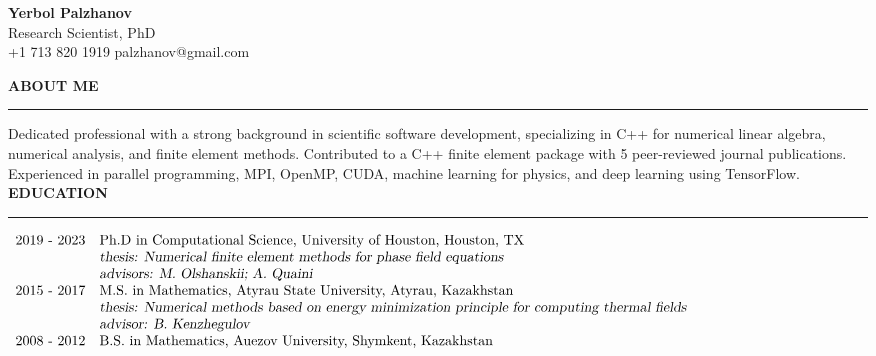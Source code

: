 \documentclass[10pt,letterpaper]{letter}
\newcommand{\gsect}[1]{\textcolor{codepurple}{\textbf{{\Large \uppercase{#1} }}} \\ \hrule}
\begin{document}
	\begin{center}
\textbf{	{\large Yerbol Palzhanov}}\\ Research Scientist, PhD\\
+1 713 820 1919 \quad palzhanov@gmail.com
	\end{center}

\gsect{About me}
Dedicated professional with a strong background in scientific software development, specializing in C++ for numerical linear algebra, numerical analysis, and finite element methods. Contributed to a C++ finite element package with {\color{red} 5 peer-reviewed journal publications}. Experienced in parallel programming, MPI, OpenMP, CUDA, machine learning for physics, and deep learning using TensorFlow. \\


\gsect{Education}

$\begin{array}{r l }
	\text{2019 - 2023} & \text{Ph.D in Computational Science, University of Houston, Houston, TX} \\
					   & \textsl{thesis: Numerical finite element methods for phase field equations} \\
					   & \textsl{advisors: M.~Olshanskii; A.~Quaini} \\
	\text{2015 - 2017} & \text{M.S. in Mathematics, Atyrau State University, Atyrau, Kazakhstan}\\
					   & \textsl{thesis: Numerical methods based on energy minimization principle for computing thermal fields} \\
					   & \textsl{advisor: B.~Kenzhegulov} \\
	\text{2008 - 2012} & \text{B.S. in Mathematics, Auezov University, Shymkent, Kazakhstan}
\end{array}$
\end{document}
